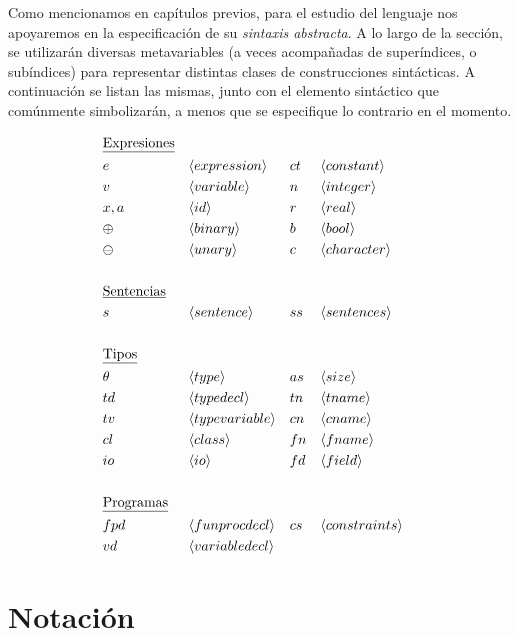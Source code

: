 Como mencionamos en capítulos previos, para el estudio del lenguaje nos apoyaremos en la especificación de su \textit{sintaxis abstracta}.
A lo largo de la sección, se utilizarán diversas metavariables (a veces acompañadas de superíndices, o subíndices) para representar distintas clases de construcciones sintácticas.
A continuación se listan las mismas, junto con el elemento sintáctico que comúnmente simbolizarán, a menos que se especifique lo contrario en el momento.

\begin{align*}
&\text{\underline{Expresiones}}
\\
&e       & &\langle expression \rangle     &  &ct      & &\langle constant \rangle       \\
&v       & &\langle variable \rangle       &  &n       & &\langle integer \rangle        \\
&x, a    & &\langle id \rangle             &  &r       & &\langle real \rangle           \\
&\oplus  & &\langle binary \rangle         &  &b       & &\langle bool \rangle           \\
&\ominus & &\langle unary \rangle          &  &c       & &\langle character \rangle      \\
\\
&\text{\underline{Sentencias}}
\\
&s       & &\langle sentence \rangle       &  &ss      & &\langle sentences \rangle      \\
\\
&\text{\underline{Tipos}}
\\
&\theta & &\langle type \rangle            &  &as      & &\langle size \rangle           \\
&td     & &\langle typedecl \rangle        &  &tn      & &\langle tname \rangle          \\
&tv     & &\langle typevariable \rangle    &  &cn      & &\langle cname \rangle          \\
&cl     & &\langle class \rangle           &  &fn      & &\langle fname \rangle          \\
&io     & &\langle io \rangle              &  &fd      & &\langle field \rangle          \\
\\
&\text{\underline{Programas}}
\\
&fpd     & &\langle funprocdecl \rangle    &  &cs     & &\langle constraints \rangle     \\
&vd      & &\langle variabledecl \rangle   \\
\end{align*}

\section{Notación}

